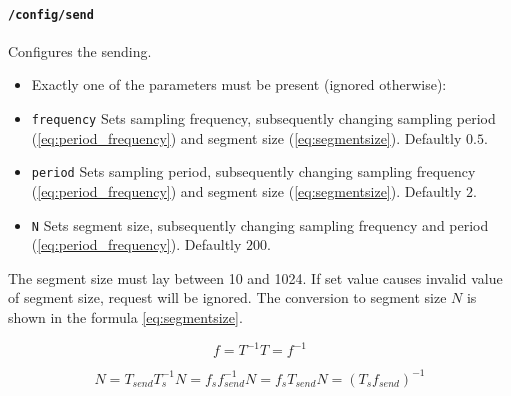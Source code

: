 \paragraph{\texttt{/config/send}}
Configures the sending.
\begin{itemize}
    \item[] Exactly one of the parameters must be present (ignored otherwise):
    \item[] \texttt{frequency} Sets sampling frequency, subsequently changing sampling period (\ref{eq:period_frequency}) and segment size (\ref{eq:segmentsize}). Defaultly $0.5$.
    \item[] \texttt{period}    Sets sampling period, subsequently changing sampling frequency (\ref{eq:period_frequency}) and segment size (\ref{eq:segmentsize}). Defaultly $2$.
    \item[] \texttt{N}         Sets segment size, subsequently changing sampling frequency and period (\ref{eq:period_frequency}). Defaultly $200$.
\end{itemize}

The segment size must lay between 10 and 1024. If set value causes invalid value of segment size,
request will be ignored. The conversion to segment size $N$ is shown in the formula \ref{eq:segmentsize}.

\begin{subequations}
\begin{equation}
f = T^{-1}
\end{equation}
\begin{equation}
T = f^{-1}
\end{equation}
\label{eq:period_frequency}
\end{subequations}

\begin{subequations}
\begin{equation}
N = T_{send}T_s^{-1}
\end{equation}
\begin{equation}
N = f_sf_{send}^{-1}
\end{equation}
\begin{equation}
N = f_sT_{send}
\end{equation}
\begin{equation}
N = (T_sf_{send})^{-1}
\end{equation}
\label{eq:segmentsize}
\end{subequations}

